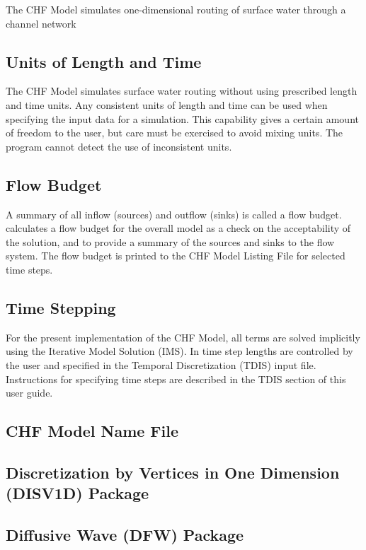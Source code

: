The CHF Model simulates one-dimensional routing of surface water through a channel network

\subsection{Units of Length and Time}
The CHF Model simulates surface water routing without using prescribed length and time units. Any consistent units of length and time can be used when specifying the input data for a simulation. This capability gives a certain amount of freedom to the user, but care must be exercised to avoid mixing units.  The program cannot detect the use of inconsistent units.

\subsection{Flow Budget}
A summary of all inflow (sources) and outflow (sinks) is called a flow budget.  \mf calculates a flow budget for the overall model as a check on the acceptability of the solution, and to provide a summary of the sources and sinks to the flow system.  The flow budget is printed to the CHF Model Listing File for selected time steps.

\subsection{Time Stepping}

For the present implementation of the CHF Model, all terms are solved implicitly using the Iterative Model Solution (IMS).  In \mf time step lengths are controlled by the user and specified in the Temporal Discretization (TDIS) input file.  Instructions for specifying time steps are described in the TDIS section of this user guide.  

\newpage
\subsection{CHF Model Name File}


\newpage
\subsection{Discretization by Vertices in One Dimension (DISV1D) Package}


\newpage
\subsection{Diffusive Wave (DFW) Package}


